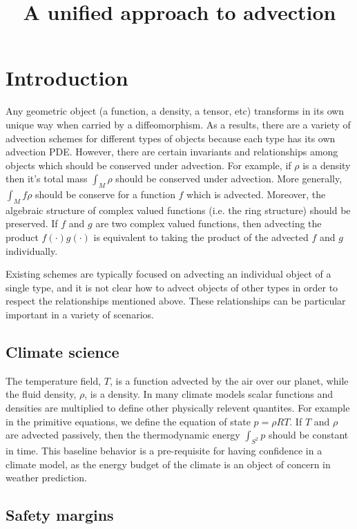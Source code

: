 \documentclass[12pt]{amsart}
\title{A unified approach to advection}
\begin{document}
\maketitle

\section{Introduction}
\label{sec:intro}

  Any geometric object (a function, a density, a tensor, etc) transforms in its own unique way when carried by a diffeomorphism.
As a results, there are a variety of advection schemes for different types of
objects because each type has its own advection PDE.
However, there are certain invariants and relationships
among objects which should be conserved under advection.
For example, if $\rho$ is a density then it's total mass $\int_M \rho$
should be conserved under advection.
More generally, $\int_M f \rho$ should be conserve for a function $f$ 
which is advected.
Moreover, the algebraic structure of complex valued functions (i.e. the ring structure) should be preserved.
If $f$ and $g$ are two complex valued functions, then 
advecting the product $f(\cdot) g(\cdot)$ is equivalent to taking the
product of the advected $f$ and $g$ individually.

Existing schemes are typically focused on advecting an individual 
object of a single type, and it is not clear how to advect objects
of other types in order to respect the relationships mentioned above.
These relationships can be particular important in a variety of scenarios.

\subsection{Climate science}
\label{sec:climate}
The temperature field, $T$, is a function advected by the air
over our planet,
while the fluid density, $\rho$, is a density.
In many climate models scalar functions and densities are multiplied to
define other physically relevent quantites.
For example in the primitive equations, we define the equation of state $p = \rho R T$.
If $T$ and $\rho$ are advected passively, then the
thermodynamic energy $\int_{S^2}p$ should be constant in time.
This baseline behavior is a pre-requisite for having confidence in a climate model, as the energy budget of the climate is an object of concern in weather prediction.

\subsection{Safety margins}
\label{sec:safety}
\end{document}
